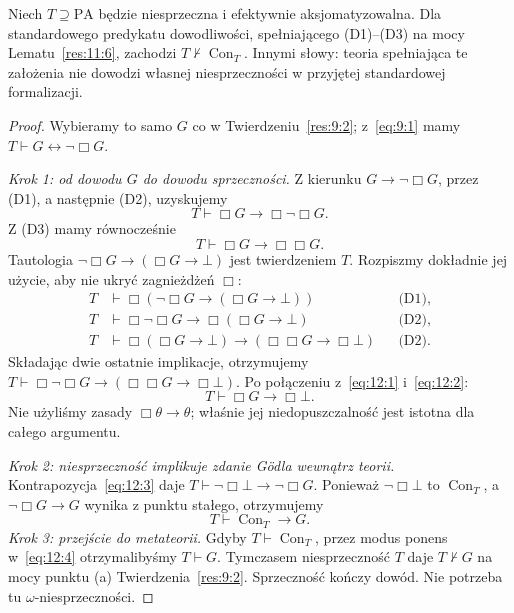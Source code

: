\begin{twierdzenie}\label{res:12:2}
Niech $T\supseteq\mathrm{PA}$ będzie niesprzeczna i efektywnie aksjomatyzowalna. Dla standardowego predykatu dowodliwości, spełniającego (D1)--(D3) na mocy Lematu~\ref{res:11:6}, zachodzi $T\nvdash\operatorname{Con}_T$. Innymi słowy: teoria spełniająca te założenia nie dowodzi własnej niesprzeczności w przyjętej standardowej formalizacji.
\end{twierdzenie}
\begin{proof}
Wybieramy to samo $G$ co w Twierdzeniu~\ref{res:9:2}; z~\eqref{eq:9:1} mamy $T\vdash G\leftrightarrow\neg\Box G$.

\emph{Krok 1: od dowodu $G$ do dowodu sprzeczności.} Z kierunku $G\to\neg\Box G$, przez (D1), a następnie (D2), uzyskujemy
\begin{equation}\label{eq:12:1}
T\vdash\Box G\to\Box\neg\Box G.
\end{equation}
Z (D3) mamy równocześnie
\begin{equation}\label{eq:12:2}
T\vdash\Box G\to\Box\Box G.
\end{equation}
Tautologia $\neg\Box G\to(\Box G\to\bot)$ jest twierdzeniem $T$. Rozpiszmy dokładnie jej użycie, aby nie ukryć zagnieżdżeń $\Box$:
\begin{align*}
T&\vdash\Box(\neg\Box G\to(\Box G\to\bot)) &&\text{(D1)},\\
T&\vdash\Box\neg\Box G\to\Box(\Box G\to\bot) &&\text{(D2)},\\
T&\vdash\Box(\Box G\to\bot)\to(\Box\Box G\to\Box\bot) &&\text{(D2)}.
\end{align*}
Składając dwie ostatnie implikacje, otrzymujemy $T\vdash\Box\neg\Box G\to(\Box\Box G\to\Box\bot)$. Po połączeniu z~\eqref{eq:12:1} i~\eqref{eq:12:2}:
\begin{equation}\label{eq:12:3}
T\vdash\Box G\to\Box\bot.
\end{equation}
Nie użyliśmy zasady $\Box\theta\to\theta$; właśnie jej niedopuszczalność jest istotna dla całego argumentu.

\emph{Krok 2: niesprzeczność implikuje zdanie Gödla wewnątrz teorii.} Kontrapozycja~\eqref{eq:12:3} daje $T\vdash\neg\Box\bot\to\neg\Box G$. Ponieważ $\neg\Box\bot$ to $\operatorname{Con}_T$, a $\neg\Box G\to G$ wynika z punktu stałego, otrzymujemy
\begin{equation}\label{eq:12:4}
T\vdash\operatorname{Con}_T\to G.
\end{equation}
\emph{Krok 3: przejście do metateorii.} Gdyby $T\vdash\operatorname{Con}_T$, przez modus ponens w~\eqref{eq:12:4} otrzymalibyśmy $T\vdash G$. Tymczasem niesprzeczność $T$ daje $T\nvdash G$ na mocy punktu (a) Twierdzenia~\ref{res:9:2}. Sprzeczność kończy dowód. Nie potrzeba tu $\omega$-niesprzeczności.
\end{proof}

